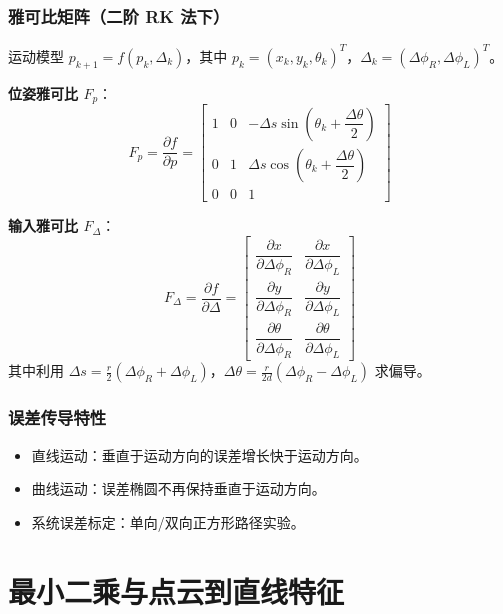 \documentclass[11pt,a4paper]{article}
\begin{document}
\subsubsection*{雅可比矩阵（二阶 RK 法下）}
运动模型 $p_{k+1}=f(p_k,\Delta_k)$，其中 $p_k=(x_k,y_k,\theta_k)^T$，$\Delta_k=(\Delta\phi_R,\Delta\phi_L)^T$。

\textbf{位姿雅可比 $F_p$}：
\[
F_p=\frac{\partial f}{\partial p}=
\begin{bmatrix}
1 & 0 & -\Delta s\sin\!\left(\theta_k+\dfrac{\Delta\theta}{2}\right)\\[0.3em]
0 & 1 & \Delta s\cos\!\left(\theta_k+\dfrac{\Delta\theta}{2}\right)\\[0.3em]
0 & 0 & 1
\end{bmatrix}
\]

\textbf{输入雅可比 $F_\Delta$}：
\[
F_\Delta=\frac{\partial f}{\partial \Delta}=
\begin{bmatrix}
\dfrac{\partial x}{\partial \Delta\phi_R} & \dfrac{\partial x}{\partial \Delta\phi_L}\\[0.4em]
\dfrac{\partial y}{\partial \Delta\phi_R} & \dfrac{\partial y}{\partial \Delta\phi_L}\\[0.4em]
\dfrac{\partial \theta}{\partial \Delta\phi_R} & \dfrac{\partial \theta}{\partial \Delta\phi_L}
\end{bmatrix}
\]
其中利用 $\Delta s=\frac{r}{2}(\Delta\phi_R+\Delta\phi_L)$，$\Delta\theta=\frac{r}{2d}(\Delta\phi_R-\Delta\phi_L)$ 求偏导。

\subsubsection*{误差传导特性}
\begin{itemize}
  \item 直线运动：垂直于运动方向的误差增长快于运动方向。
  \item 曲线运动：误差椭圆不再保持垂直于运动方向。
  \item 系统误差标定：单向/双向正方形路径实验。
\end{itemize}

\section{最小二乘与点云到直线特征}
\end{document}
